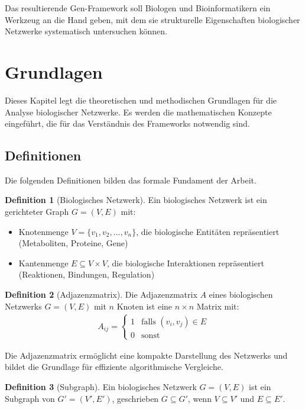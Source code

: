 ﻿\documentclass[a4paper,12pt]{article}
\theoremstyle{definition}
\newtheorem{definition}{Definition}
\begin{document}
Das resultierende Gen-Framework soll Biologen und Bioinformatikern ein Werkzeug an die Hand geben, mit dem sie strukturelle Eigenschaften biologischer Netzwerke systematisch untersuchen können.

\section{Grundlagen}

Dieses Kapitel legt die theoretischen und methodischen Grundlagen für die Analyse biologischer Netzwerke. Es werden die mathematischen Konzepte eingeführt, die für das Verständnis des Frameworks notwendig sind.

\subsection{Definitionen}

Die folgenden Definitionen bilden das formale Fundament der Arbeit.

\begin{definition}[Biologisches Netzwerk]
	Ein biologisches Netzwerk ist ein gerichteter Graph $G = (V, E)$ mit:
	\begin{itemize}
		\item[-] Knotenmenge $V = \{v_1, v_2, \ldots, v_n\}$, die biologische Entitäten repräsentiert (Metaboliten, Proteine, Gene)
		\item[-] Kantenmenge $E \subseteq V \times V$, die biologische Interaktionen repräsentiert (Reaktionen, Bindungen, Regulation)
	\end{itemize}
\end{definition}

\begin{definition}[Adjazenzmatrix]
	Die Adjazenzmatrix $A$ eines biologischen Netzwerks $G = (V, E)$ mit $n$ Knoten ist eine $n \times n$ Matrix mit:
	\begin{align}
		A_{ij} = \begin{cases}
			1 & \text{falls } (v_i, v_j) \in E \\
			0 & \text{sonst}
		\end{cases}
	\end{align}
\end{definition}

Die Adjazenzmatrix ermöglicht eine kompakte Darstellung des Netzwerks und bildet die Grundlage für effiziente algorithmische Vergleiche.

\begin{definition}[Subgraph]
	Ein biologisches Netzwerk $G = (V, E)$ ist ein Subgraph von $G' = (V', E')$, geschrieben $G \subseteq G'$, wenn $V \subseteq V'$ und $E \subseteq E'$.
\end{definition}
\end{document}
